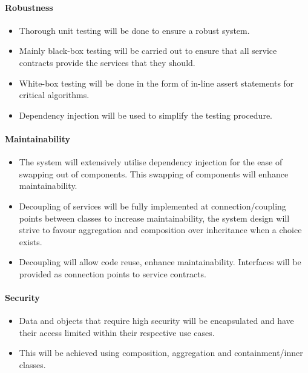 \paragraph{Robustness}
\begin{itemize}
	\item Thorough unit testing will be done to ensure a robust system. 
	\item Mainly black-box testing will be carried out to ensure that all service contracts provide the services that they should.
	\item White-box testing will be done in the form of in-line assert statements for critical algorithms.
	\item Dependency injection will be used to simplify the testing procedure.
\end{itemize}

\paragraph{Maintainability}
\begin{itemize}
	\item The system will extensively utilise dependency injection for the ease of swapping out of components. This swapping of components will enhance maintainability.
	\item Decoupling of services will be fully implemented at connection/coupling points  between classes to increase maintainability, the system design will strive to favour aggregation and composition over inheritance when a choice exists.
	\item Decoupling will allow code reuse, enhance maintainability. Interfaces will be provided as connection points to service contracts.
\end{itemize}
\paragraph{Security}
\begin{itemize}
	\item Data and objects that require high security will be encapsulated and have their access limited within their respective use cases.
	\item This will be achieved using composition, aggregation and containment/inner classes.
\end{itemize}